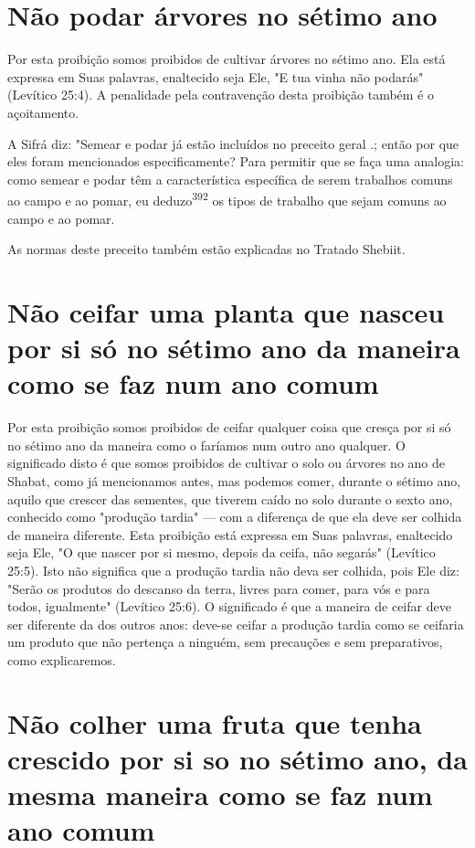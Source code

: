 \section{Não podar árvores no sétimo ano}

Por esta proibição somos proibidos de cultivar árvores no sétimo ano.
Ela está expressa em Suas palavras, enaltecido seja Ele, "E tua vinha
não podarás" (Levítico 25:4). A penalidade pela contravenção desta
proibição tam­bém é o açoitamento.

A Sifrá diz: "Semear e podar já estão incluídos no preceito geral
.; então por que eles foram mencionados
especificamente? Para permitir que se faça uma analogia: como semear e
podar têm a característica específica de se­rem trabalhos comuns ao
campo e ao pomar, eu deduzo\textsuperscript{392} os tipos de traba­lho
que sejam comuns ao campo e ao pomar.


As normas deste preceito também estão explicadas no Tratado Shebiit.

\section{Não ceifar uma planta que nasceu por si só no sétimo ano da
maneira como se faz num ano comum}

Por esta proibição somos proibidos de ceifar qualquer coisa que cres­ça
por si só no sétimo ano da maneira como o faríamos num outro ano
qual­quer. O significado disto é que somos proibidos de cultivar o solo
ou árvores no ano de Shabat, como já mencionamos antes, mas podemos
comer, durante o sétimo ano, aquilo que crescer das sementes, que
tiverem caído no solo du­rante o sexto ano, conhecido como "produção
tardia" --- com a diferença de que ela deve ser colhida de maneira
diferente. Esta proibição está expressa em Suas palavras, enaltecido
seja Ele, "O que nascer por si mesmo, depois da ceifa, não segarás"
(Levítico 25:5). Isto não significa que a produção tardia não deva ser
colhida, pois Ele diz: "Serão os produtos do descanso da terra, livres
para comer, para vós e para todos, igualmente" (Levítico 25:6). O
significado é que a maneira de ceifar deve ser diferente da dos outros
anos: deve-se ceifar a pro­dução tardia como se ceifaria um produto que
não pertença a ninguém, sem precauções e sem preparativos, como
explicaremos.

\section{Não colher uma fruta que tenha crescido por si so no sétimo ano, da
mesma maneira como se faz num ano comum}

